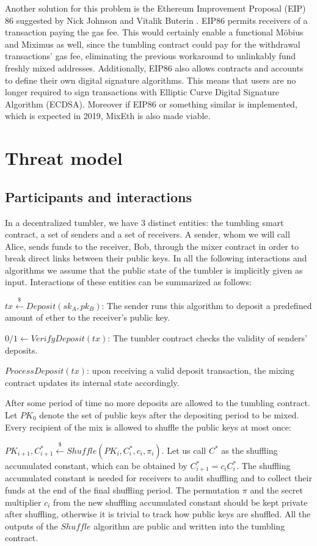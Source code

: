 \documentclass[a4paper]{article}
\theoremstyle{definition}
\begin{document}
Another solution for this problem is the Ethereum Improvement Proposal (EIP) 86 suggested by Nick Johnson and Vitalik Buterin \cite{buterin2017accounteip}. EIP86 permits receivers of a transaction paying the gas fee. This would certainly enable a functional Möbius and Miximus as well, since the tumbling contract could pay for the withdrawal transactions' gas fee, eliminating the previous workaround to unlinkably fund freshly mixed addresses. Additionally, EIP86 also allows contracts and accounts to define their own digital signature algorithms. This means that users are no longer required to sign transactions with Elliptic Curve Digital Signature Algorithm (ECDSA). Moreover if EIP86 or something similar is implemented, which is expected in 2019, MixEth is also made viable.  

\section{Threat model}
\subsection{Participants and interactions}
In a decentralized tumbler, we have $3$ distinct entities: the tumbling smart contract, a set of senders and a set of receivers. A sender, whom we will call Alice, sends funds to the receiver, Bob, through the mixer contract in order to break direct links between their public keys. In all the following interactions and algorithms we assume that the public state of the tumbler is implicitly given as input. Interactions of these entities can be summarized as follows: 
 
$tx\stackrel{\$}{\leftarrow}Deposit(sk_A,pk_B)$: The sender runs this algorithm to deposit a predefined amount of ether to the receiver's public key.

$0/1\leftarrow VerifyDeposit(tx)$: The tumbler contract checks the validity of senders' deposits.

$ProcessDeposit(tx)$: upon receiving a valid deposit transaction, the mixing contract updates its internal state accordingly.

After some period of time no more deposits are allowed to the tumbling contract. Let $PK_{0}$ denote the set of public keys after the depositing period to be mixed. Every recipient of the mix is allowed to shuffle the public keys at most once: 

$PK_{i+1},C_{i+1}^{*}\stackrel{\$}{\leftarrow}Shuffle(PK_{i},C^{*}_{i},c_{i},\pi_{i})$. Let us call $C^{*}$ as the shuffling accumulated constant, which can be obtained by $C^{*}_{i+1}=c_{i}C^{*}_{i}$. The shuffling accumulated constant is needed for receivers to audit shuffling and to collect their funds at the end of the final shuffling period. The permutation $\pi$ and the secret multiplier $c_{i}$ from the new shuffling accumulated constant should be kept private after shuffling, otherwise it is trivial to track how public keys are shuffled. All the outputs of the $Shuffle$ algorithm are public and written into the tumbling contract.  
\end{document}
